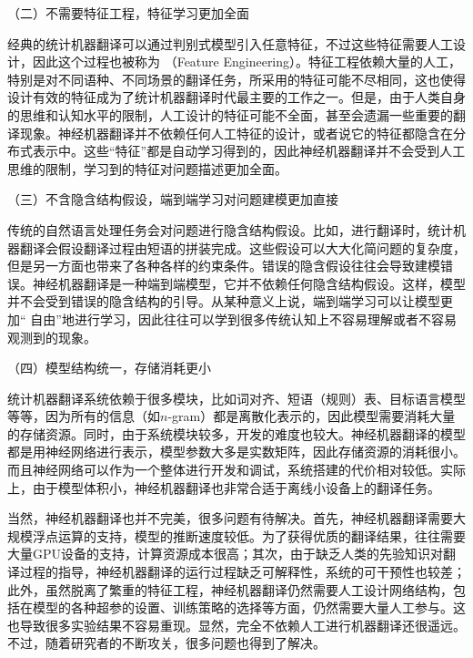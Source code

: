 \vspace{0.5em}
\parinterval  （二）不需要特征工程，特征学习更加全面

\parinterval  经典的统计机器翻译可以通过判别式模型引入任意特征，不过这些特征需要人工设计，因此这个过程也被称为{\small{}} （Feature Engineering）。特征工程依赖大量的人工，特别是对不同语种、不同场景的翻译任务，所采用的特征可能不尽相同，这也使得设计有效的特征成为了统计机器翻译时代最主要的工作之一。但是，由于人类自身的思维和认知水平的限制，人工设计的特征可能不全面，甚至会遗漏一些重要的翻译现象。神经机器翻译并不依赖任何人工特征的设计，或者说它的特征都隐含在分布式表示中。这些``特征''都是自动学习得到的，因此神经机器翻译并不会受到人工思维的限制，学习到的特征对问题描述更加全面。

\vspace{0.5em}
\parinterval  （三）不含隐含结构假设，端到端学习对问题建模更加直接

\parinterval  传统的自然语言处理任务会对问题进行隐含结构假设。比如，进行翻译时，统计机器翻译会假设翻译过程由短语的拼装完成。这些假设可以大大化简问题的复杂度，但是另一方面也带来了各种各样的约束条件。错误的隐含假设往往会导致建模错误。神经机器翻译是一种端到端模型，它并不依赖任何隐含结构假设。这样，模型并不会受到错误的隐含结构的引导。从某种意义上说，端到端学习可以让模型更加`` 自由''地进行学习，因此往往可以学到很多传统认知上不容易理解或者不容易观测到的现象。

\vspace{0.5em}
\parinterval  （四）模型结构统一，存储消耗更小

\parinterval  统计机器翻译系统依赖于很多模块，比如词对齐、短语（规则）表、目标语言模型等等，因为所有的信息（如$n$-gram）都是离散化表示的，因此模型需要消耗大量的存储资源。同时，由于系统模块较多，开发的难度也较大。神经机器翻译的模型都是用神经网络进行表示，模型参数大多是实数矩阵，因此存储资源的消耗很小。而且神经网络可以作为一个整体进行开发和调试，系统搭建的代价相对较低。实际上，由于模型体积小，神经机器翻译也非常合适于离线小设备上的翻译任务。

\vspace{0.5em}
\parinterval  当然，神经机器翻译也并不完美，很多问题有待解决。首先，神经机器翻译需要大规模浮点运算的支持，模型的推断速度较低。为了获得优质的翻译结果，往往需要大量GPU设备的支持，计算资源成本很高；其次，由于缺乏人类的先验知识对翻译过程的指导，神经机器翻译的运行过程缺乏可解释性，系统的可干预性也较差；此外，虽然脱离了繁重的特征工程，神经机器翻译仍然需要人工设计网络结构，包括在模型的各种超参的设置、训练策略的选择等方面，仍然需要大量人工参与。这也导致很多实验结果不容易重现。显然，完全不依赖人工进行机器翻译还很遥远。不过，随着研究者的不断攻关，很多问题也得到了解决。


